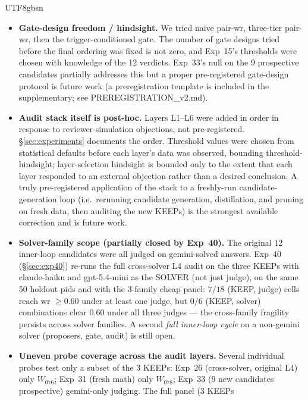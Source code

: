 \documentclass{article}
\begin{document}
\begin{CJK*}{UTF8}{gbsn}
\begin{itemize}[leftmargin=*,topsep=2pt,itemsep=2pt]
  \item \textbf{Gate-design freedom / hindsight.} We tried naive
    pair-wr, three-tier pair-wr, then the trigger-conditioned
    gate. The number of gate designs tried before the final
    ordering was fixed is not zero, and Exp~15's thresholds were
    chosen with knowledge of the 12 verdicts. Exp~33's null on
    the 9 prospective candidates partially addresses this but a
    proper pre-registered gate-design protocol is future work
    (a preregistration template is included in the supplementary;
    see PREREGISTRATION\_v2.md).
  \item \textbf{Audit stack itself is post-hoc.} Layers L1--L6
    were added in order in response to reviewer-simulation
    objections, not pre-registered. \S\ref{sec:experiments}
    documents the order. Threshold values were chosen from
    statistical defaults before each layer's data was observed,
    bounding threshold-hindsight; layer-selection hindsight is
    bounded only to the extent that each layer responded to an
    external objection rather than a desired conclusion. A truly
    pre-registered application of the stack to a freshly-run
    candidate-generation loop (i.e.\ rerunning candidate
    generation, distillation, and pruning on fresh data, then
    auditing the new KEEPs) is the strongest available correction
    and is future work.
  \item \textbf{Solver-family scope (partially closed by Exp~40).}
    The original 12 inner-loop candidates were all judged on
    gemini-solved answers. Exp~40 (\S\ref{sec:exp40}) re-runs the
    full cross-solver L4 audit on the three KEEPs with
    claude-haiku and gpt-5.4-mini as the SOLVER (not just judge),
    on the same 50 holdout pids and with the 3-family cheap
    panel: \(7/18\) (KEEP, judge) cells reach wr \(\geq 0.60\)
    under at least one judge, but \(0/6\) (KEEP, solver)
    combinations clear \(0.60\) under all three judges --- the
    cross-family fragility persists across solver families.
    A second \emph{full inner-loop cycle} on a non-gemini solver
    (proposers, gate, audit) is still open.
  \item \textbf{Uneven probe coverage across the audit layers.}
    Several individual probes test only a subset of the 3 KEEPs:
    Exp~26 (cross-solver, original L4) only \(W_{076}\); Exp~31
    (fresh math) only \(W_{078}\); Exp~33 (\(9\) new candidates
    prospective) gemini-only judging. The full panel (3 KEEPs

\end{itemize}
\end{CJK*}
\end{document}
